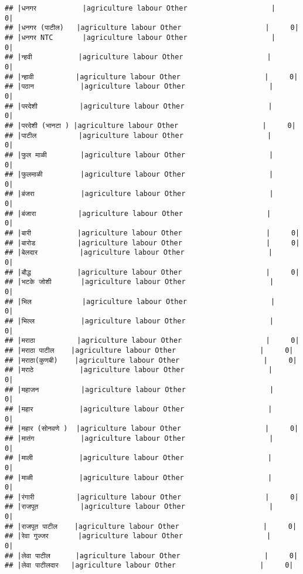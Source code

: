 \documentclass[
]{article}
\begin{document}
\begin{verbatim}
## |धनगर           |agriculture labour Other                    |     0|
## |धनगर (पाटील)   |agriculture labour Other                    |     0|
## |धनगर NTC       |agriculture labour Other                    |     0|
## |न्हवी           |agriculture labour Other                    |     0|
## |न्हावी          |agriculture labour Other                    |     0|
## |पठान           |agriculture labour Other                    |     0|
## |परदेशी          |agriculture labour Other                    |     0|
## |परदेशी (भानटा ) |agriculture labour Other                    |     0|
## |पाटील          |agriculture labour Other                    |     0|
## |फुल माळी        |agriculture labour Other                    |     0|
## |फुलमाळी         |agriculture labour Other                    |     0|
## |बंजरा           |agriculture labour Other                    |     0|
## |बंजारा          |agriculture labour Other                    |     0|
## |बारी           |agriculture labour Other                    |     0|
## |बारोड          |agriculture labour Other                    |     0|
## |बेलदार          |agriculture labour Other                    |     0|
## |बौद्ध           |agriculture labour Other                    |     0|
## |भटके जोशी       |agriculture labour Other                    |     0|
## |भिल            |agriculture labour Other                    |     0|
## |भिल्ल           |agriculture labour Other                    |     0|
## |मराठा          |agriculture labour Other                    |     0|
## |मराठा पाटील    |agriculture labour Other                    |     0|
## |मराठा(कुणबी)    |agriculture labour Other                    |     0|
## |मराठे           |agriculture labour Other                    |     0|
## |महाजन          |agriculture labour Other                    |     0|
## |महार           |agriculture labour Other                    |     0|
## |महार (सोनवणे )  |agriculture labour Other                    |     0|
## |मातंग           |agriculture labour Other                    |     0|
## |माली           |agriculture labour Other                    |     0|
## |माळी           |agriculture labour Other                    |     0|
## |रंगारी          |agriculture labour Other                    |     0|
## |राजपूत          |agriculture labour Other                    |     0|
## |राजपूत पाटील    |agriculture labour Other                    |     0|
## |रेवा गुज्जर       |agriculture labour Other                    |     0|
## |लेवा पाटील      |agriculture labour Other                    |     0|
## |लेवा पाटीलदार   |agriculture labour Other                    |     0|

\end{verbatim}
\end{document}
